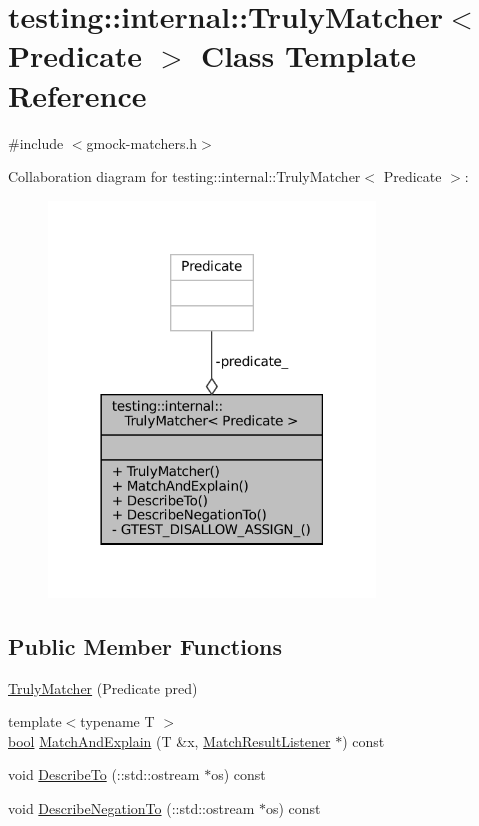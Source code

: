 \hypertarget{classtesting_1_1internal_1_1TrulyMatcher}{}\section{testing\+:\+:internal\+:\+:Truly\+Matcher$<$ Predicate $>$ Class Template Reference}
\label{classtesting_1_1internal_1_1TrulyMatcher}


{\ttfamily \#include $<$gmock-\/matchers.\+h$>$}



Collaboration diagram for testing\+:\+:internal\+:\+:Truly\+Matcher$<$ Predicate $>$\+:
\nopagebreak
\begin{figure}[H]
\begin{center}
\leavevmode
\includegraphics[width=246pt]{classtesting_1_1internal_1_1TrulyMatcher__coll__graph}
\end{center}
\end{figure}
\subsection*{Public Member Functions}
\begin{DoxyCompactItemize}
\item 
\hyperlink{classtesting_1_1internal_1_1TrulyMatcher_a9fdc4ddba121e0dad4773b5685e0f28d}{Truly\+Matcher} (Predicate pred)
\item 
{\footnotesize template$<$typename T $>$ }\\\hyperlink{classbool}{bool} \hyperlink{classtesting_1_1internal_1_1TrulyMatcher_ad3781c661936a845ec165c1aad239634}{Match\+And\+Explain} (T \&x, \hyperlink{classtesting_1_1MatchResultListener}{Match\+Result\+Listener} $\ast$) const
\item 
void \hyperlink{classtesting_1_1internal_1_1TrulyMatcher_ac327b4bd408386f489c4279e7e3f9530}{Describe\+To} (\+::std\+::ostream $\ast$os) const
\item 
void \hyperlink{classtesting_1_1internal_1_1TrulyMatcher_a2e753f5d571b6a51b8ef620dcbb3a591}{Describe\+Negation\+To} (\+::std\+::ostream $\ast$os) const
\end{DoxyCompactItemize}
